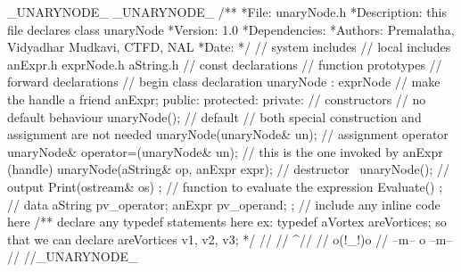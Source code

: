 \BeginCppCode
\Hifnde _UNARYNODE_
\Hdefin _UNARYNODE_
{\BBC}/**
\BL
  *File: unaryNode.h
\BL
  *Description:
\BL
   this file declares class unaryNode
\BL
  *Version: 1.0
\BL
  *Dependencies:
\BL
  *Authors: Premalatha, Vidyadhar Mudkavi, CTFD, NAL
\BL
  *Date:
  */{\EBC}
\BL
{\BLC}// system includes{\ELC}
\BL
{\BLC}// local includes{\ELC}
\Hinclud {\dq}anExpr.h{\dq}
\Hinclud {\dq}exprNode.h{\dq}
\Hinclud {\dq}aString.h{\dq}
\BL
{\BLC}// const declarations{\ELC}
\BL
{\BLC}// function prototypes{\ELC}
\BL
{\BLC}// forward declarations{\ELC}
\BL
{\BLC}// begin class declaration{\ELC}
\Clas unaryNode : \Publi exprNode
{\ob}
{\BLC}// make the handle a friend{\ELC}
   \Frien \Clas anExpr;
\BL
   public:
\BL
   protected:
\BL
   private:
\BL
   {\BLC}// constructors{\ELC}
 {\BLC}// no default behaviour{\ELC}
      unaryNode(); {\BLC}// default{\ELC}
\Hendi
\BL
{} {\BLC}// both special construction and assignment are not needed{\ELC}
      unaryNode(\Cons unaryNode& un);
\BL
   {\BLC}// assignment operator{\ELC}
      unaryNode& operator=(\Cons unaryNode& un);
\Hendi
\BL
   {\BLC}// this is the one invoked by anExpr (handle){\ELC}
      unaryNode(\Cons aString& op, anExpr expr);
\BL
   {\BLC}// destructor{\ELC}
      ~unaryNode();
\BL
   {\BLC}// output{\ELC}
      \Voi Print(ostream& os) \Cons;
\BL
   {\BLC}// function to evaluate the expression{\ELC}
      \In Evaluate() \Cons;
\BL
   {\BLC}// data{\ELC}
      aString pv_operator;
      anExpr  pv_operand;
{\cb};
\BL
{\BLC}// include any inline code here{\ELC}
\BL
{\BBC}/**
   declare any typedef statements here
     ex: typedef aVortex areVortices;
   so that we can declare
     areVortices v1, v2, v3;
  */{\EBC}
                              {\BLC}//                 {\ELC}
                              {\BLC}//      {\bs}{\bs}^//      {\ELC}
                              {\BLC}//     o(!_!)o     {\ELC}
                              {\BLC}// --m--  o  --m-- {\ELC}
                              {\BLC}//                 {\ELC}
\BL
\Hendi {\BLC}//_UNARYNODE_{\ELC}
\EndCppCode
